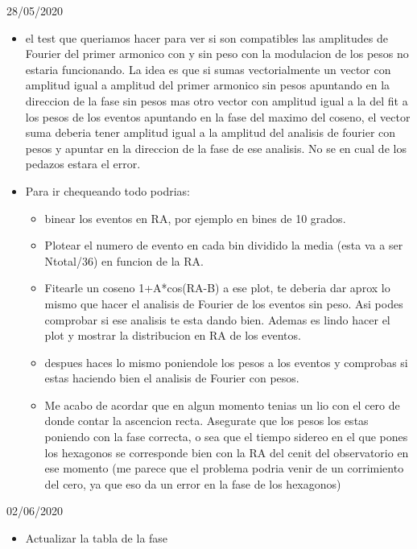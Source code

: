 28/05/2020

\begin{itemize}
	\done llama la atencion la modulacion de los hexagonos y de los pesos que pones en la tabla 1.3. Deberian tener aprox la misma amplitud y fase opuesta. Creo que estan mal los valores del fit a los hexagonos, deberia ser a ojo una amplitud cerca a 0.0035 y una fase cerca de 100. Igual es raro porque las curvas en el plot tienen pinta razonable. Fijate que cuando fiteas un coseno 1+A*cos(RA-B) va con menos B, asi B es la fase donde la funcion tiene el maximo. Fijate que si fiteas a una funcion con media distinta de 1, la amplitud es el factor A en C*(1+A*cos(RA-B)) y  no el factor  A en C+A*cos(RA-B)

	\item  el test que queriamos hacer para ver si son compatibles las amplitudes de Fourier del primer armonico con y sin peso con la modulacion de los pesos no estaria funcionando. La idea es que si sumas vectorialmente un vector con amplitud igual a amplitud del primer armonico sin pesos apuntando en la direccion de la fase sin pesos mas otro vector con amplitud igual a la del fit a los pesos de los eventos apuntando en la fase del maximo del coseno, el vector suma deberia tener amplitud igual a la amplitud del analisis de fourier con pesos y apuntar en la direccion de la fase de ese analisis. No se en cual de los pedazos estara el error.
	
	\item Para ir chequeando todo podrias:
	\begin{itemize}
	
		\item  binear los eventos en RA, por ejemplo en bines de 10 grados. 
		\item Plotear el numero de evento en cada bin dividido la media (esta va a ser Ntotal/36) en funcion de la RA. 
		\item Fitearle un coseno 1+A*cos(RA-B) a ese plot, te deberia dar aprox lo mismo que hacer el analisis de Fourier de los eventos sin peso. Asi podes comprobar si ese analisis te esta dando bien. Ademas es lindo hacer el plot y mostrar la distribucion en RA de los eventos.
	
		\item  despues haces lo mismo poniendole los pesos a los eventos y comprobas si estas haciendo bien el analisis de Fourier con pesos.
	
		\item  Me acabo de acordar que en algun momento tenias un lio con el  cero de donde contar la ascencion recta. Asegurate que los pesos los estas poniendo con la fase correcta, o sea que el tiempo sidereo en el que pones los hexagonos se corresponde bien con la RA del cenit del observatorio en ese momento (me parece que el problema podria venir de un 	corrimiento del cero, ya que eso da un error en la fase de los hexagonos)
	\end{itemize}

\end{itemize}


02/06/2020

\begin{itemize}
	\item Actualizar la tabla de la fase
\end{itemize}